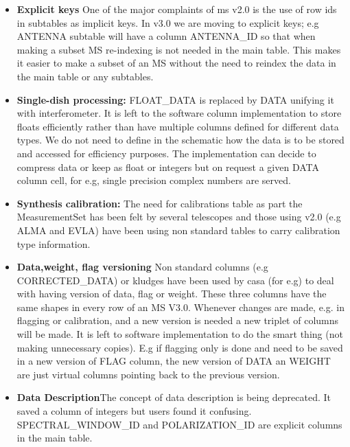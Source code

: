 \documentclass{article}
\begin{document}
\begin{itemize}

\item{{\bf Explicit keys} One of the major complaints of ms v2.0 is
  the use of row ids in subtables as implicit keys. In v3.0 we are
  moving to explicit keys; e.g ANTENNA subtable will have a column
  ANTENNA\_ID so that when making a subset MS re-indexing is not
  needed in the main table. This makes it easier to make a subset of
  an MS without the need to reindex the data in the main table or any
  subtables.}

\item{{\bf Single-dish processing:} FLOAT\_DATA is
  replaced by DATA unifying it with interferometer. It is left to the
  software column implementation to store floats efficiently rather
  than have multiple columns defined for different data types. We
  do not need to define in the schematic how the data is to be stored
  and accessed for efficiency purposes. The implementation can decide
  to compress data or keep as float or integers but on request a given
  DATA column cell, for e.g, single precision complex numbers are
  served.}


\item{{\bf Synthesis calibration:} The need for calibrations table as
    part the MeasurementSet has been felt by several telescopes and
    those using v2.0 (e.g ALMA and EVLA) have been using non standard
    tables to carry calibration type information.}

\item{{\bf Data,weight, flag versioning} Non standard columns (e.g
    CORRECTED\_DATA) or kludges have been used by casa (for e.g) to
    deal with having version of data, flag or weight. These three columns
    have the same shapes in every row of an MS V3.0.  Whenever
    changes are made, e.g. in flagging or calibration, and a new version
    is needed a new triplet of columns will be made. It is left to
    software implementation to do the smart thing (not making
    unnecessary copies). E.g if flagging only is done and need to be
    saved in a new version of FLAG column, the new version of DATA an
    WEIGHT are just virtual columns pointing back to the
    previous version.}

\item{{\bf Data Description}The concept of data description is being
    deprecated. It saved a column of integers but users found it
    confusing. SPECTRAL\_WINDOW\_ID and POLARIZATION\_ID are explicit
    columns in the main table.}


\end{itemize}
\end{document}
